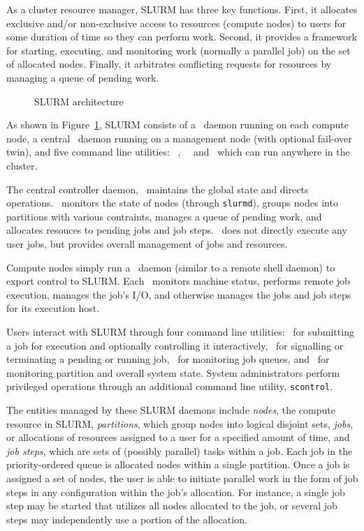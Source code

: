 \documentclass[10pt,onecolumn,times]{../common/llncs}
\begin{document}
{As a cluster resource manager, SLURM has three key functions.  First,
it allocates exclusive and/or non-exclusive access to resources (compute
nodes) to users for some duration of time so they can perform work.
Second, it provides a framework for starting, executing, and monitoring
work (normally a parallel job) on the set of allocated nodes.  Finally,
it arbitrates conflicting requests for resources by managing a queue of
pending work.

\begin{figure}[tb]
\centerline{}
\caption{\small SLURM architecture}
\label{arch}
\end{figure}

As shown in Figure~\ref{arch}, SLURM consists of a \slurmd\ daemon
running on each compute node, a central \slurmctld\ daemon running
on a management node (with optional fail-over twin), and five command
line utilities: \srun\, \scancel, \sinfo\, \squeue\, and \scontrol\,
which can run anywhere in the cluster.

The central controller daemon, \slurmctld\, maintains the global
state and directs operations.
\slurmctld\ monitors the state of nodes (through {\tt slurmd}),
groups nodes into partitions with various contraints,
manages a queue of pending work, and
allocates resouces to pending jobs and job steps.
\slurmctld\ does not directly execute any user jobs, but
provides overall management of jobs and resources.

Compute nodes simply run a \slurmd\ daemon (similar to a remote
shell daemon) to export control to SLURM.
Each \slurmd\ monitors machine status,
performs remote job execution, manages the job's I/O, and otherwise
manages the jobs and job steps for its execution host.

Users interact with SLURM through four command line utilities:
\srun\ for submitting a job for execution and optionally controlling
it interactively,
\scancel\ for signalling or terminating a pending or running job,
\squeue\ for monitoring job queues, and
\sinfo\ for monitoring partition and overall system state.
System administrators perform privileged operations through an
additional command line utility, {\tt scontrol}.

The entities managed by these SLURM daemons include {\em nodes}, the
compute resource in SLURM, {\em partitions}, which group nodes into
logical disjoint sets, {\em jobs}, or allocations of resources assigned
to a user for a specified amount of time, and {\em job steps}, which
are sets of (possibly parallel) tasks within a job.  Each job in the
priority-ordered queue is allocated nodes within a single partition.
Once a job is assigned a set of nodes, the user is able to initiate
parallel work in the form of job steps in any configuration within
the job's allocation.
For instance, a single job step may be started that utilizes all nodes
allocated to the job, or several job steps may independently use a
portion of the allocation.

}
\end{document}
